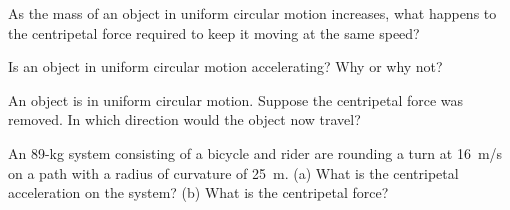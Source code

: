 \documentclass[main-physics.tex]{subfiles}
\begin{document}
\begin{exercise} \label{M6NkHB}
    As the mass of an object in uniform circular motion increases, what happens to the centripetal force required to keep it moving at the same speed?
\end{exercise}

\begin{exercise} \label{IAjJBC}
    Is an object in uniform circular motion accelerating? Why or why not?
\end{exercise}

\begin{exercise} \label{G8I4Up}
    An object is in uniform circular motion. Suppose the centripetal force was removed. In which direction would the object now travel?
\end{exercise}

\begin{exercise} \label{Kv8Old}
An 89-kg system consisting of a bicycle and rider are rounding a turn at \SI{16}{m/s} on a path with a radius of curvature of \SI{25}{m}. (a) What is the centripetal acceleration on the system? (b) What is the centripetal force?
\end{exercise}


\clearpage
\end{document}
